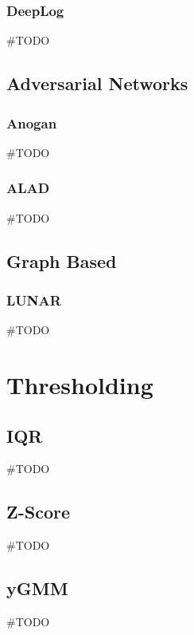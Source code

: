 \subsubsection{DeepLog}
\#TODO

\subsection{Adversarial Networks}
\subsubsection{Anogan}
\#TODO
\subsubsection{ALAD}
\#TODO

\subsection{Graph Based}
\subsubsection{LUNAR}
\#TODO
\section{Thresholding}
\subsection{IQR}
\#TODO
\subsection{Z-Score}
\#TODO
\subsection{yGMM}
\#TODO